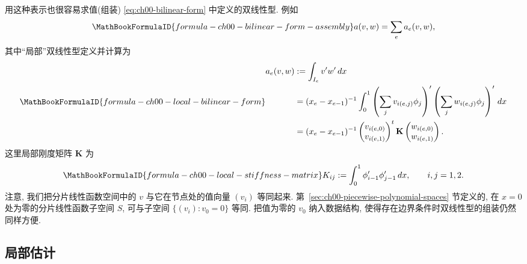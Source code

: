 用这种表示也很容易求值(组装) \eqref{eq:ch00-bilinear-form} 中定义的双线性型. 例如
\[
\MathBookFormulaID{formula-ch00-bilinear-form-assembly}
a(v,w)=\sum_ea_e(v,w),
\]
其中``局部''双线性型定义并计算为
\[
\MathBookFormulaID{formula-ch00-local-bilinear-form}
\begin{aligned}
a_e(v,w)&:=\int_{I_e}v'w'\,dx\\
&=(x_e-x_{e-1})^{-1}\int_0^1
\left(\sum_jv_{i(e,j)}\phi_j\right)'
\left(\sum_jw_{i(e,j)}\phi_j\right)'\,dx\\
&=(x_e-x_{e-1})^{-1}
\begin{pmatrix}v_{i(e,0)}\\v_{i(e,1)}\end{pmatrix}^{t}
\mathbf K
\begin{pmatrix}w_{i(e,0)}\\w_{i(e,1)}\end{pmatrix}.
\end{aligned}
\]
这里局部刚度矩阵 $\mathbf K$ 为
\[
\MathBookFormulaID{formula-ch00-local-stiffness-matrix}
K_{ij}:=\int_0^1\phi_{i-1}'\phi_{j-1}'\,dx,
\qquad i,j=1,2.
\]
注意, 我们把分片线性函数空间中的 $v$ 与它在节点处的值向量 $(v_i)$ 等同起来. 第~\ref{sec:ch00-piecewise-polynomial-spaces} 节定义的, 在 $x=0$ 处为零的分片线性函数子空间 $S$, 可与子空间 $\{(v_i):v_0=0\}$ 等同. 把值为零的 $v_0$ 纳入数据结构, 使得存在边界条件时双线性型的组装仍然同样方便.

\subsection{局部估计}
\label{sec:ch00-local-estimates}

